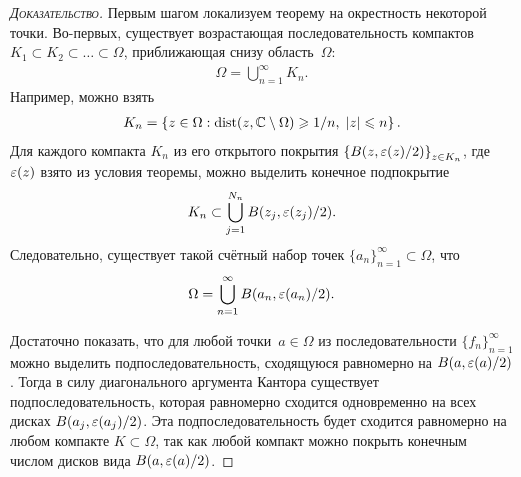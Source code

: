 \documentclass[../complex-analysis.tex]{subfiles}
\begin{document}
\begin{proof}[\normalfont\textsc{Доказательство}]
 Первым шагом локализуем теорему на окрестность некоторой точки. Во-первых, существует возрастающая последовательность компактов $ K_1 \subset K_2 \subset \ldots \subset \Omega $, приближающая снизу область~$ \Omega $:
 \begin{align*}
  \Omega = \bigcup_{n=1}^{\infty}K_n.
 \end{align*} Например, можно взять
 \begin{align*}
  K_n = \left\{ z \in \Omega : \mathop{\mathrm{dist}}(z, \mathbb{C} \setminus \Omega) \geqslant 1 / n,\; \left| z \right| \leqslant n \right\}.
 \end{align*} Для каждого компакта $ K_n $ из его открытого покрытия $ \left\{B(z, \varepsilon(z) / 2)\right\}_{z \in K_n} $, где $ \varepsilon(z) $ взято из условия теоремы, можно выделить конечное подпокрытие
 \begin{align*}
  K_n \subset \bigcup_{j=1}^{N_n} B(z_j, \varepsilon(z_j) / 2).
 \end{align*} Следовательно, существует такой счётный набор точек $ \{a_{n}\}_{n=1}^{\infty} \subset \Omega $, что
 \begin{align*}
  \Omega = \bigcup_{n=1}^{\infty} B(a_n, \varepsilon(a_n) / 2).
 \end{align*}

 Достаточно показать, что для любой точки~$ a \in \Omega $ из последовательности $ \{f_{n}\}_{n=1}^{\infty}  $ можно выделить подпоследовательность, сходящуюся равномерно на $ B(a, \varepsilon(a)/2) $. Тогда в силу диагонального аргумента Кантора существует подпоследовательность, которая равномерно сходится одновременно на всех дисках $ B(a_j, \varepsilon(a_j) / 2) $. Эта подпоследовательность будет сходится равномерно на любом компакте $ K \subset \Omega $, так как любой компакт можно покрыть конечным числом дисков вида $ B(a, \varepsilon(a) / 2) $.


\end{proof}
\end{document}
